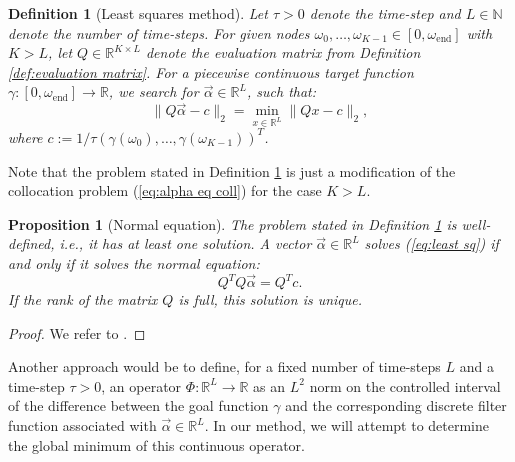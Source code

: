 \documentclass[a4paper,11pt,bibliography=totoc,listof=totoc,headinclude=true,cleardoublepage=empty,oneside]{scrbook}
\newtheorem{definition}[theorem]{Definition}
\newtheorem{prop}[theorem]{Proposition}
\newcommand{\R}{\mathbb{R}}
\newcommand{\N}{\mathbb{N}}
\newcommand{\e}{\mathrm{end}}
\renewcommand{\eqref}[1]{(\ref{#1})}
\begin{document}
\begin{definition}[Least squares method]\label{def:least sq}
    Let $\tau>0$ denote the time-step and $L \in \N$ denote the number of time-steps. For given nodes $\omega_0, \dots, \omega_{K-1} \in [0, \omega_\e]$ with $K>L$, let $Q\in\R^{K\times L}$ denote the evaluation matrix from Definition \ref{def:evaluation matrix}. For a piecewise continuous target function $\gamma : [0, \omega_\e] \rightarrow \R$, we search for $\Vec{\alpha} \in \R^{L}$, such that:
    \begin{equation}\label{eq:least sq}
        \| Q\vec{\alpha} - c \|_2 = \min_{x\in \R^L} \| Qx - c \|_2,
    \end{equation}
    where $c := 1/\tau \left(\gamma(\omega_0), \dots, \gamma(\omega_{K-1})\right)^T$.
\end{definition}

Note that the problem stated in Definition \ref{def:least sq} is just a modification of the collocation problem \eqref{eq:alpha eq coll} for the case $K>L$.

\begin{prop}[Normal equation]\label{prop:normal eq}
    The problem stated in Definition \ref{def:least sq} is well-defined, i.e., it has at least one solution. A vector $\Vec{\alpha} \in \R^{L}$ solves \eqref{eq:least sq} if and only if it solves the normal equation:
    \begin{equation}\label{eq:normal eq}
        Q^T Q \Vec{\alpha} = Q^T c.
    \end{equation}
    If the rank of the matrix $Q$ is full, this solution is unique.
\end{prop}
\begin{proof}
    We refer to \cite[p. 103]{Praetorius}.
\end{proof}

Another approach would be to define, for a fixed number of time-steps $L$ and a time-step $\tau>0$, an operator $\Phi: \R^L \rightarrow \R$ as an $L^2$ norm on the controlled interval of the difference between the goal function $\gamma$ and the corresponding discrete filter function associated with $\Vec{\alpha} \in \R^L$. In our method, we will attempt to determine the global minimum of this continuous operator.
\end{document}
